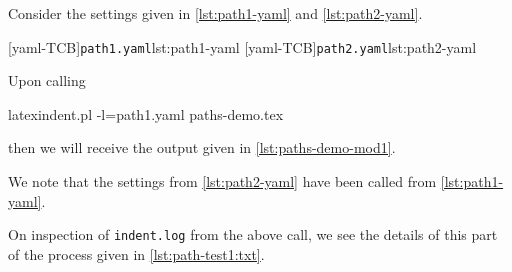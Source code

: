   \begin{example}
  Consider the settings given in \cref{lst:path1-yaml} and \cref{lst:path2-yaml}.

  \begin{cmhtcbraster}[raster column skip=.1\linewidth]
   [yaml-TCB]{\texttt{path1.yaml}}{lst:path1-yaml}
   [yaml-TCB]{\texttt{path2.yaml}}{lst:path2-yaml}
  \end{cmhtcbraster}

  Upon calling

  \begin{commandshell}
latexindent.pl -l=path1.yaml paths-demo.tex
\end{commandshell}

  then we will receive the output given in \cref{lst:paths-demo-mod1}.


  We note that the settings from \cref{lst:path2-yaml} have been called from
  \cref{lst:path1-yaml}.

  On inspection of \texttt{indent.log} from the above call, we see the details of this
  part of the process given in \cref{lst:path-test1:txt}.

  \end{example}

